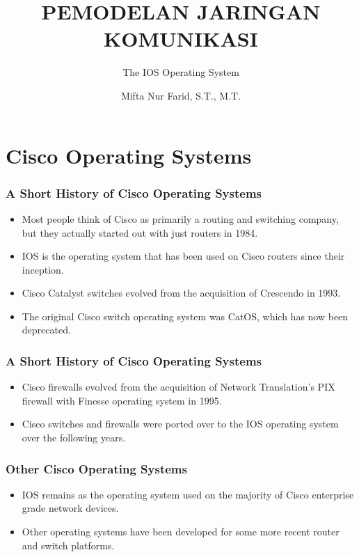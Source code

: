 \documentclass[pdflatex,compress]{beamer}
\title{PEMODELAN JARINGAN KOMUNIKASI}
\subtitle{The IOS Operating System}
\author{Mifta Nur Farid, S.T., M.T.}
\begin{document}
\maketitle

\section{Cisco Operating Systems}

\begin{frame}
	\frametitle{A Short History of Cisco Operating Systems}
	\begin{itemize}
		\item Most people think of Cisco as primarily a routing and switching company, but they actually started out with just routers in 1984.
		\item IOS is the operating system that has been used on Cisco routers since their inception.
		\item Cisco Catalyst switches evolved from the acquisition of Crescendo in 1993.
		\item The original Cisco switch operating system was CatOS, which has now been deprecated.
	\end{itemize}
\end{frame}

\begin{frame}
	\frametitle{A Short History of Cisco Operating Systems}
	\begin{itemize}
		\item Cisco firewalls evolved from the acquisition of Network Translation’s PIX firewall with Finesse operating system in 1995.
		\item Cisco switches and firewalls were ported over to the IOS operating system over the following years.
	\end{itemize}
\end{frame}

\begin{frame}
	\frametitle{Other Cisco Operating Systems}
	\begin{itemize}
		\item IOS remains as the operating system used on the majority of Cisco enterprise grade network devices.
		\item Other operating systems have been developed for some more recent router and switch platforms.
	\end{itemize}
\end{frame}
\end{document}
